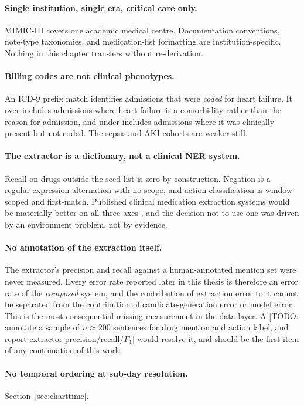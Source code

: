 \paragraph{Single institution, single era, critical care only.} MIMIC-III covers
one academic medical centre. Documentation conventions, note-type taxonomies,
and medication-list formatting are institution-specific. Nothing in this chapter
transfers without re-derivation.

\paragraph{Billing codes are not clinical phenotypes.} An ICD-9 prefix match
identifies admissions that were \emph{coded} for heart failure. It over-includes
admissions where heart failure is a comorbidity rather than the reason for
admission, and under-includes admissions where it was clinically present but
not coded. The sepsis and AKI cohorts are weaker still.

\paragraph{The extractor is a dictionary, not a clinical NER system.} Recall on
drugs outside the seed list is zero by construction. Negation is a
regular-expression alternation with no scope, and action classification is
window-scoped and first-match. Published clinical medication extraction systems
would be materially better on all three axes \citep{henry2020n2c2}, and the
decision not to use one was driven by an environment problem, not by evidence.

\paragraph{No annotation of the extraction itself.} The extractor's precision
and recall against a human-annotated mention set were never measured. Every
error rate reported later in this thesis is therefore an error rate of the
\emph{composed} system, and the contribution of extraction error to it cannot
be separated from the contribution of candidate-generation error or model error.
This is the most consequential missing measurement in the data layer. A
[TODO: annotate a sample of $n \approx 200$ sentences for drug mention and
action label, and report extractor precision/recall/$F_1$] would resolve it, and
should be the first item of any continuation of this work.

\paragraph{No temporal ordering at sub-day resolution.} Section~\ref{sec:charttime}.

